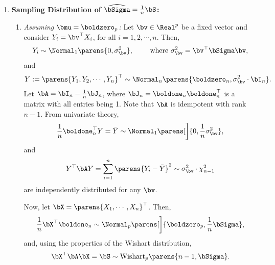 \documentclass[12pt]{article}
\begin{document}
\begin{enumerate}[label=\textbf{\arabic*.}]
	\item \textbf{Sampling Distribution of $\widehat{\bSigma} = \frac{1}{n} \bS$:} 
	\begin{enumerate}
		\item \textit{Assuming $\bmu = \boldzero_p$:} Let $\bv \in \Real^p$ be a fixed vector and consider $Y_i = \bv^\top X_i$, for all $i = 1, 2, \cdots, n$. Then, 
		\begin{align*}
			Y_i \sim \Normal_1 \parens{0, \sigma_{\bv}^2}, \qquad \text{ where } \sigma_{\bv}^2 = \bv^\top \bSigma \bv, 
		\end{align*}
		and 
		\begin{align*}
			Y := \parens{Y_1, Y_2, \cdots, Y_n}^\top \sim \Normal_n \parens{\boldzero_n, \sigma_{\bv}^2 \cdot \bI_n}. 
		\end{align*}
		Let $\bA = \bI_n - \frac{1}{n} \bJ_n$, where $\bJ_n = \boldone_n \boldone_n^\top$ is a matrix with all entries being 1. Note that $\bA$ is idempotent with rank $n - 1$. From univariate theory, 
		\begin{align*}
			\frac{1}{n} \boldone_n^\top Y = \bar{Y} \sim \Normal_1 \parens[\bigg]{0, \frac{1}{n} \sigma_{\bv}^2}, 
		\end{align*}
		and 
		\begin{align*}
			Y^\top \bA Y = \sum_{i=1}^n \parens{Y_i - \bar{Y}}^2 \sim \sigma_{\bv}^2 \cdot \chi_{n-1}^2
		\end{align*}
		are independently distributed for any $\bv$. 
		
		Now, let $\bX = \parens{X_1, \cdots, X_n}^\top$. Then, 
		\begin{align*}
			\frac{1}{n} \bX^\top \boldone_{n} \sim \Normal_p \parens[\bigg]{\boldzero_p, \frac{1}{n} \bSigma}, 
		\end{align*}
		and, using the properties of the Wishart distribution, 
		\begin{align}
			\bX^\top \bA \bX = \bS \sim \mathrm{Wishart}_p \parens{n-1, \bSigma}. 
		\end{align}
		

\end{enumerate}
\end{enumerate}
\end{document}
